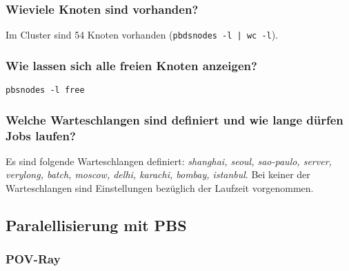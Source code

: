 \subsubsection{Wieviele Knoten sind vorhanden?}
	Im Cluster sind 54 Knoten vorhanden (\texttt{pbdsnodes -l | wc -l}).
\subsubsection{Wie lassen sich alle freien Knoten anzeigen?}
	\texttt{pbsnodes -l free}
\subsubsection{Welche Warteschlangen sind definiert und wie lange d\"urfen Jobs laufen?}
	Es sind folgende Warteschlangen definiert: 
	\textsl{shanghai, seoul, sao-paulo, server, verylong, batch, moscow, delhi,
	karachi, bombay, istanbul}.
	Bei keiner der Warteschlangen sind Einstellungen bezüglich der Laufzeit
	vorgenommen.

\subsection{Paralellisierung mit PBS}

\subsubsection{POV-Ray}

